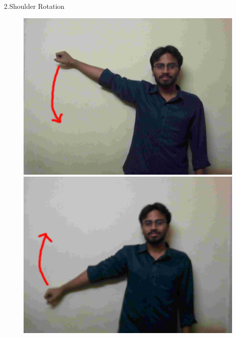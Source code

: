 \documentclass{beamer}
\begin{document}
\begin{frame}{2.Shoulder Rotation}
  \begin{figure}
      \centering
      \includegraphics[scale = .06]{gestures/21.jpg} 
      \includegraphics[scale = .06]{gestures/22.jpg} 
  \end{figure}
\end{frame}
\end{document}

